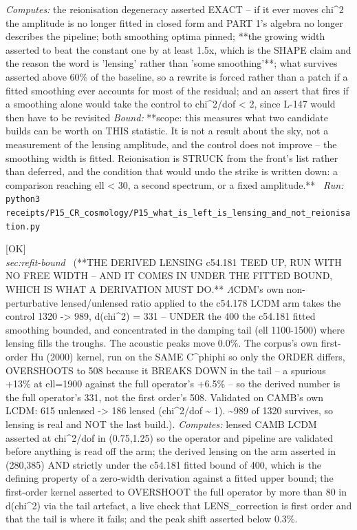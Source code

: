 \begin{description}
\emph{Computes:} the reionisation degeneracy asserted EXACT -- if it ever moves chi\textasciicircum{}2 the amplitude is no longer fitted in closed form and PART 1's algebra no longer describes the pipeline; both smoothing optima pinned; **the growing width asserted to beat the constant one by at least 1.5x, which is the SHAPE claim and the reason the word is 'lensing' rather than 'some smoothing'**; what survives asserted above 60\% of the baseline, so a rewrite is forced rather than a patch if a fitted smoothing ever accounts for most of the residual; and an assert that fires if a smoothing alone would take the control to chi\textasciicircum{}2/dof < 2, since L-147 would then have to be revisited
 \emph{Bound:} **scope: this measures what two candidate builds can be worth on THIS statistic. It is not a result about the sky, not a measurement of the lensing amplitude, and the control does not improve -- the smoothing width is fitted. Reionisation is STRUCK from the front's list rather than deferred, and the condition that would undo the strike is written down: a comparison reaching ell < 30, a second spectrum, or a fixed amplitude.**
\ \emph{Run:} \texttt{python3 receipts/P15\_CR\_cosmology/P15\_what\_is\_left\_is\_lensing\_and\_not\_reionisation.py}
\item[\label{rcpt:P15_derived_lensing_on_the_lcdm_arm}\texttt{P15\_derived\_lensing\_on\_the\_lcdm\_arm}]\hfill\textsf{[OK]}\\
\textit{sec:refit-bound} \ (**THE DERIVED LENSING c54.181 TEED UP, RUN WITH NO FREE WIDTH -- AND IT COMES IN UNDER THE FITTED BOUND, WHICH IS WHAT A DERIVATION MUST DO.** \ensuremath{\Lambda}CDM's own non-perturbative lensed/unlensed ratio applied to the c54.178 LCDM arm takes the control 1320 -> 989, d(chi\textasciicircum{}2) = 331 -- UNDER the 400 the c54.181 fitted smoothing bounded, and concentrated in the damping tail (ell 1100-1500) where lensing fills the troughs. The acoustic peaks move 0.0\%. The corpus's own first-order Hu (2000) kernel, run on the SAME C\textasciicircum{}phiphi so only the ORDER differs, OVERSHOOTS to 508 because it BREAKS DOWN in the tail -- a spurious +13\% at ell=1900 against the full operator's +6.5\% -- so the derived number is the full operator's 331, not the first order's 508. Validated on CAMB's own LCDM: 615 unlensed -> 186 lensed (chi\textasciicircum{}2/dof \textasciitilde{} 1). \textasciitilde{}989 of 1320 survives, so lensing is real and NOT the last build.). 
\emph{Computes:} lensed CAMB LCDM asserted at chi\textasciicircum{}2/dof in (0.75,1.25) so the operator and pipeline are validated before anything is read off the arm; the derived lensing on the arm asserted in (280,385) AND strictly under the c54.181 fitted bound of 400, which is the defining property of a zero-width derivation against a fitted upper bound; the first-order kernel asserted to OVERSHOOT the full operator by more than 80 in d(chi\textasciicircum{}2) via the tail artefact, a live check that LENS\_correction is first order and that the tail is where it fails; and the peak shift asserted below 0.3\%.

\end{description}
